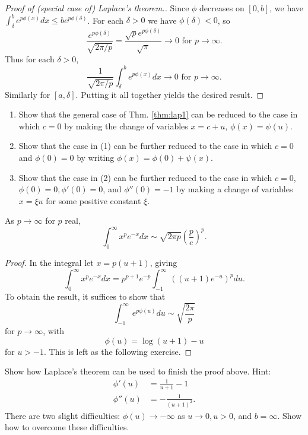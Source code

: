 \documentclass{mathnotes}
\begin{document}
\begin{proof}[Proof of (special case of) Laplace's theorem.]
    Since $\phi$ decreases on $[0,b]$, we have $\int_\delta^b e^{p\phi(x)}dx\leq be^{p\phi(\delta)}$. For each $\delta>0$
    we have $\phi(\delta)<0$, so 
    \[\frac{e^{p\phi(\delta)}}{\sqrt{2\pi/p}}=\frac{\sqrt{p}e^{p\phi(\delta)}}{\sqrt{\pi}}\to 0\text{ for }p\to\infty.\]
    Thus for each $\delta>0$,
    \[\frac{1}{\sqrt{2\pi/p}}\int_\delta^b e^{p\phi(x)}dx\to 0\text{ for }p\to\infty.\]
    Similarly for $[a,\delta]$. Putting it all together yields the desired result.
\end{proof}

\begin{exc}\hfill
    \label{exc:1}
    \begin{enumerate}
        \item Show that the general case of Thm. \ref{thm:lap1} can be reduced to the case in which $c=0$ by making
            the change of variables $x=c+u$, $\phi(x)=\psi(u)$.
        \item Show that the case in (1) can be further reduced to the case in which $c=0$ and $\phi(0)=0$ by
            writing $\phi(x)=\phi(0)+\psi(x)$.
        \item Show that the case in (2) can be further reduced to the case in which $c=0$, $\phi(0)=0,\phi'(0)=0$,
            and $\phi''(0)=-1$ by making a change of variables $x=\xi u$ for some positive constant $\xi$.
    \end{enumerate}
\end{exc}

\begin{thm}
    As $p\to\infty$ for $p$ real,
    \[\int_0^\infty x^p e^{-x}dx\sim \sqrt{2\pi p}\left( \frac{p}{e} \right)^p.\]
\end{thm}
\begin{proof}
    In the integral let $x=p(u+1)$, giving
    \[\int_0^\infty x^p e^{-x}dx=p^{p+1}e^{-p}\int_{-1}^\infty\left( (u+1)e^{-u} \right)^p du.\]
    To obtain the result, it suffices to show that
    \[\int_{-1}^\infty e^{p\phi(u)} du\sim\sqrt{\frac{2\pi}{p}}\]
    for $p\to\infty$, with
    \[\phi(u)=\log(u+1)-u\]
    for $u>-1$. This is left as the following exercise.
\end{proof}

\begin{exc}
    Show how Laplace's theorem can be used to finish the proof above. Hint:
    \begin{align*}
        \phi'(u) &= \frac{1}{u+1}-1\\
        \phi''(u) &= -\frac{1}{(u+1)^2}.
    \end{align*}
    There are two slight difficulties: $\phi(u)\to-\infty$ as $u\to 0,u>0$, and $b=\infty$.
    Show how to overcome these difficulties.
\end{exc}
\end{document}
